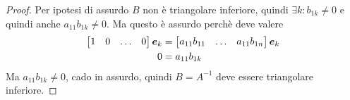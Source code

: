 \begin{proof}
Per ipotesi di assurdo $B$ non \`e triangolare inferiore, quindi $\exists k:
b_{1k} \not = 0$ e quindi anche $a_{11}b_{1k} \not = 0$. Ma questo \`e assurdo
perch\`e deve valere 
\begin{displaymath}
\begin{split}
\begin{bmatrix}
1 & 0 & \ldots & 0
\end{bmatrix} \boldsymbol{e}_{k} &= 
\begin{bmatrix}
a_{11}b_{11} & \ldots & a_{11}b_{1n}
\end{bmatrix} \boldsymbol{e}_{k} \\
0 &= a_{11}b_{1k}
\end{split}
\end{displaymath}
Ma $a_{11}b_{1k} \not = 0$, cado in assurdo, quindi $B=A^{-1}$ deve essere
triangolare inferiore.
\end{proof}

